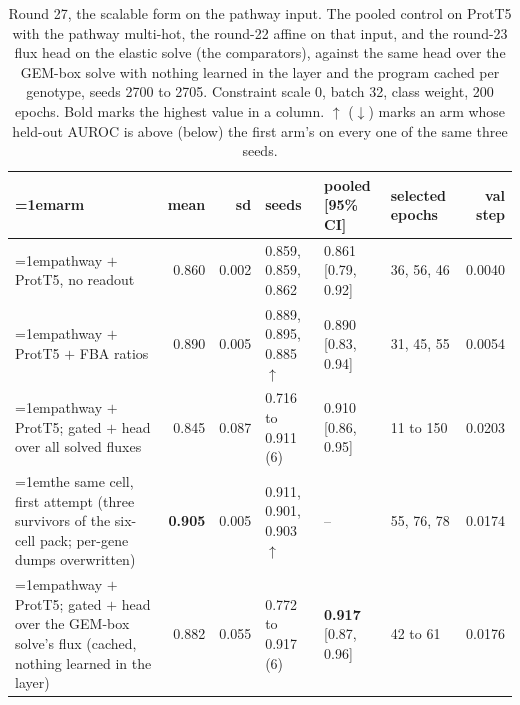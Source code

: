 \begin{table}[H]
  \centering
  \scriptsize
  \setlength{\tabcolsep}{2.5pt}
  \caption[Round 27, the scalable form on the pathway input]{Round 27, the scalable form on the pathway input. The pooled control on ProtT5 with the pathway multi-hot, the round-22 affine on that input, and the round-23 flux head on the elastic solve (the comparators), against the same head over the GEM-box solve with nothing learned in the layer and the program cached per genotype, seeds 2700 to 2705. Constraint scale 0, batch 32, class weight, 200 epochs. Bold marks the highest value in a column. $\uparrow$ ($\downarrow$) marks an arm whose held-out AUROC is above (below) the first arm's on every one of the same three seeds.}
  \label{tab:w43}
  \begin{tabular}{@{}>{\raggedright\hangindent=1em\hangafter=1\arraybackslash}p{81.1mm}rrlllr@{}}
    \hline
    arm & mean & sd & seeds & pooled [95\% CI] & selected epochs & val step \\
    \hline
    pathway $+$ ProtT5, no readout & 0.860 & 0.002 & 0.859, 0.859, 0.862 & 0.861 [0.79, 0.92] & 36, 56, 46 & 0.0040 \\
    pathway $+$ ProtT5 $+$ FBA ratios & 0.890 & 0.005 & 0.889, 0.895, 0.885 $\uparrow$ & 0.890 [0.83, 0.94] & 31, 45, 55 & 0.0054 \\
    pathway $+$ ProtT5; gated $+$ head over all solved fluxes & 0.845 & 0.087 & 0.716 to 0.911 (6) & 0.910 [0.86, 0.95] & 11 to 150 & 0.0203 \\
    the same cell, first attempt (three survivors of the six-cell pack; per-gene dumps overwritten) & \textbf{0.905} & 0.005 & 0.911, 0.901, 0.903 $\uparrow$ & -- & 55, 76, 78 & 0.0174 \\
    pathway $+$ ProtT5; gated $+$ head over the GEM-box solve's flux (cached, nothing learned in the layer) & 0.882 & 0.055 & 0.772 to 0.917 (6) & \textbf{0.917} [0.87, 0.96] & 42 to 61 & 0.0176 \\
    \hline
  \end{tabular}
\end{table}
